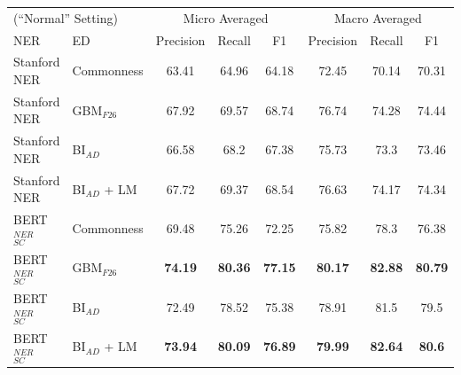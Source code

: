 \documentclass{report}
\theoremstyle{definition}
\theoremstyle{remark}
\begin{document}
\begin{table}[H]
    \centering
    \begin{tabular}{l l c c c| c c c}
    \multicolumn{2}{l}{(``Normal'' Setting)}&\multicolumn{3}{c|}{Micro Averaged}&\multicolumn{3}{c}{Macro Averaged} \\
    NER & ED &Precision&Recall&F1&Precision&Recall&F1\\
    \hline
    Stanford NER & Commonness & 63.41&64.96&64.18&72.45&70.14&	70.31\\
    Stanford NER & GBM$_{F26}$& 67.92&69.57&68.74&76.74&74.28&	74.44\\
    Stanford NER & BI$_{AD}$ &66.58&68.2&67.38&75.73&73.3&	73.46\\
    Stanford NER  & BI$_{AD}$ + LM &67.72&69.37&68.54&76.63&74.17&74.34\\
    BERT$_{SC}^{NER}$ & Commonness & 69.48&75.26&72.25&75.82&78.3&	76.38\\
    BERT$_{SC}^{NER}$ & GBM$_{F26}$ & \textbf{74.19}&\textbf{80.36}&\textbf{77.15}&\textbf{80.17}&\textbf{82.88}&	\textbf{80.79}\\
    BERT$_{SC}^{NER}$ & BI$_{AD}$ &72.49&78.52&75.38&78.91&81.5&	79.5\\
    BERT$_{SC}^{NER}$ & BI$_{AD}$ + LM & \textbf{73.94}&	\textbf{80.09}&	\textbf{76.89}&	\textbf{79.99}&	\textbf{82.64}&	\textbf{80.6}\\
    \end{tabular}
    

\end{table}
\end{document}
